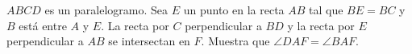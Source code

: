 $ABCD$ es un paralelogramo. Sea $E$ un punto en la recta $AB$ tal que $BE = BC$ y $B$ está entre $A$ y $E$. La recta por $C$ perpendicular a $BD$ y la recta por $E$ perpendicular a $AB$ se intersectan en $F$. Muestra que $\angle DAF = \angle BAF$. 